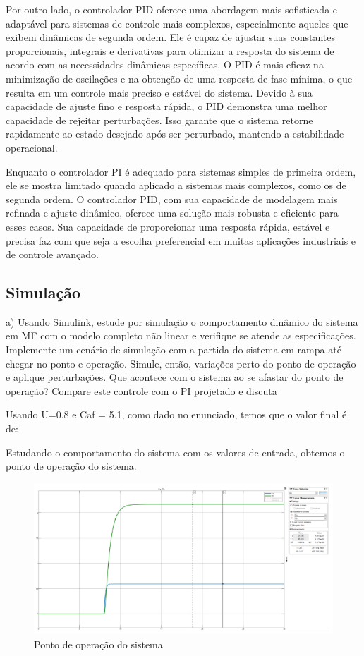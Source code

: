 \documentclass[a4paper,12pt]{article}
\begin{document}
Por outro lado, o controlador PID oferece uma abordagem mais sofisticada e adaptável para sistemas de controle mais complexos, especialmente aqueles que exibem dinâmicas de segunda ordem. Ele é capaz de ajustar suas constantes proporcionais, integrais e derivativas para otimizar a resposta do sistema de acordo com as necessidades dinâmicas específicas. O PID é mais eficaz na minimização de oscilações e na obtenção de uma resposta de fase mínima, o que resulta em um controle mais preciso e estável do sistema. Devido à sua capacidade de ajuste fino e resposta rápida, o PID demonstra uma melhor capacidade de rejeitar perturbações. Isso garante que o sistema retorne rapidamente ao estado desejado após ser perturbado, mantendo a estabilidade operacional.

Enquanto o controlador PI é adequado para sistemas simples de primeira ordem, ele se mostra limitado quando aplicado a sistemas mais complexos, como os de segunda ordem. O controlador PID, com sua capacidade de modelagem mais refinada e ajuste dinâmico, oferece uma solução mais robusta e eficiente para esses casos. Sua capacidade de proporcionar uma resposta rápida, estável e precisa faz com que seja a escolha preferencial em muitas aplicações industriais e de controle avançado.

\newpage









\subsection{Simulação}

a) Usando Simulink, estude por simulação o comportamento dinâmico do sistema em MF 
com o modelo completo não linear e verifique se atende as especificações. 
Implemente um cenário de simulação com a partida do sistema em rampa até chegar 
no ponto e operação. Simule, então, variações perto do ponto de operação e aplique 
perturbações. Que acontece com o sistema ao se afastar do ponto de operação?
Compare este controle com o PI projetado e discuta

Usando U=0.8 e Caf = 5.1, como dado no enunciado, temos que o valor final é de:

Estudando o comportamento do sistema com os valores de entrada, obtemos o ponto
de operação do sistema.

\begin{figure}[H]
    \centering
    \includegraphics[width=0.8\linewidth]{image7.png}
    \caption{Ponto de operação do sistema}
    
\end{figure}
\end{document}
